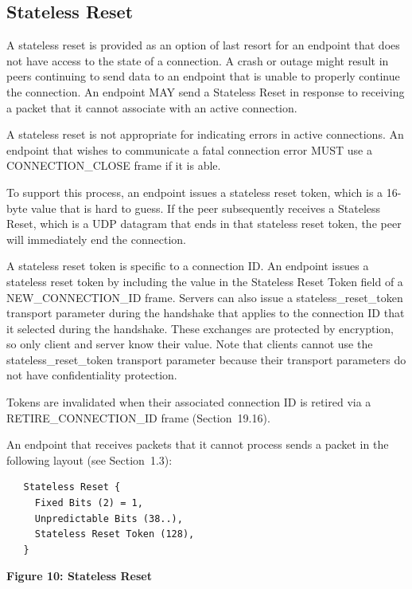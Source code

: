 \documentclass{article}
\begin{document}
\subsection{Stateless Reset}

A stateless reset is provided as an option of last resort for an endpoint that does not have access to the state of a connection.  A crash or outage might result in peers continuing to send data to an endpoint that is unable to properly continue the connection.  An endpoint MAY send a Stateless Reset in response to receiving a packet that it cannot associate with an active connection.

A stateless reset is not appropriate for indicating errors in active connections.  An endpoint that wishes to communicate a fatal connection error MUST use a CONNECTION\_CLOSE frame if it is able.

To support this process, an endpoint issues a stateless reset token, which is a 16-byte value that is hard to guess.  If the peer subsequently receives a Stateless Reset, which is a UDP datagram that ends in that stateless reset token, the peer will immediately end the connection.

A stateless reset token is specific to a connection ID.  An endpoint issues a stateless reset token by including the value in the Stateless Reset Token field of a NEW\_CONNECTION\_ID frame.  Servers can also issue a stateless\_reset\_token transport parameter during the handshake that applies to the connection ID that it selected during the handshake.  These exchanges are protected by encryption, so only client and server know their value.  Note that clients cannot use the stateless\_reset\_token transport parameter because their transport parameters do not have confidentiality protection.

Tokens are invalidated when their associated connection ID is retired via a RETIRE\_CONNECTION\_ID frame (Section~19.16).

An endpoint that receives packets that it cannot process sends a packet in the following layout (see Section~1.3):

\begin{verbatim}
   Stateless Reset {
     Fixed Bits (2) = 1,
     Unpredictable Bits (38..),
     Stateless Reset Token (128),
   }
\end{verbatim}

\begin{center}
\textbf{Figure 10: Stateless Reset}
\end{center}
\end{document}
